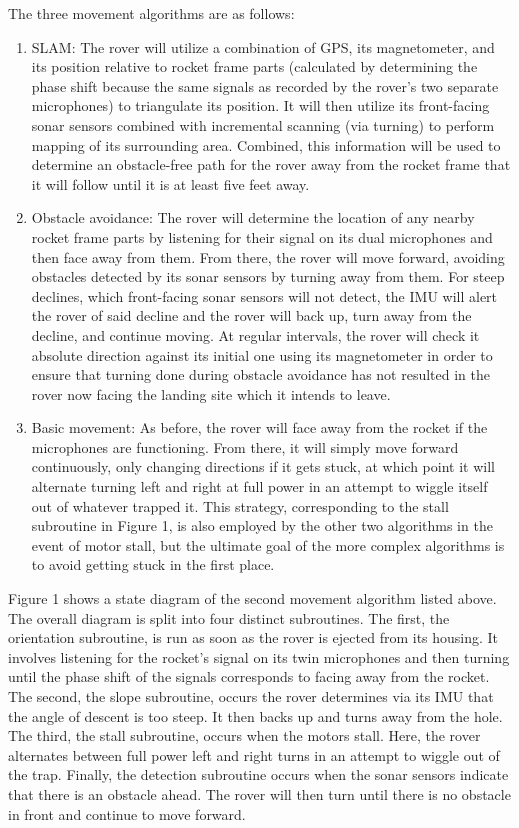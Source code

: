 \documentclass[onecolumn, draftclsnofoot,10pt, compsoc]{IEEEtran}
\begin{document}
The three movement algorithms are as follows:
\begin{enumerate}
\item SLAM: The rover will utilize a combination of GPS, its magnetometer, and its position relative to rocket frame parts (calculated by determining the phase shift because the same signals as recorded by the rover's two separate microphones) to triangulate its position. It will then utilize its front-facing sonar sensors combined with incremental scanning (via turning) to perform mapping of its surrounding area. Combined, this information will be used to determine an obstacle-free path for the rover away from the rocket frame that it will follow until it is at least five feet away. 
\item Obstacle avoidance: The rover will determine the location of any nearby rocket frame parts by listening for their signal on its dual microphones and then face away from them. From there, the rover will move forward, avoiding obstacles detected by its sonar sensors by turning away from them. For steep declines, which front-facing sonar sensors will not detect, the IMU will alert the rover of said decline and the rover will back up, turn away from the decline, and continue moving. At regular intervals, the rover will check it absolute direction against its initial one using its magnetometer in order to ensure that turning done during obstacle avoidance has not resulted in the rover now facing the landing site which it intends to leave.
\item Basic movement: As before, the rover will face away from the rocket if the microphones are functioning. From there, it will simply move forward continuously, only changing directions if it gets stuck, at which point it will alternate turning left and right at full power in an attempt to wiggle itself out of whatever trapped it. This strategy, corresponding to the stall subroutine in Figure 1, is also employed by the other two algorithms in the event of motor stall, but the ultimate goal of the more complex algorithms is to avoid getting stuck in the first place.
\end{enumerate}
Figure 1 shows a state diagram of the second movement algorithm listed above. The overall diagram is split into four distinct subroutines. The first, the orientation subroutine, is run as soon as the rover is ejected from its housing. It involves listening for the rocket's signal on its twin microphones and then turning until the phase shift of the signals corresponds to facing away from the rocket. The second, the slope subroutine, occurs the rover determines via its IMU that the angle of descent is too steep. It then backs up and turns away from the hole. The third, the stall subroutine, occurs when the motors stall. Here, the rover alternates between full power left and right turns in an attempt to wiggle out of the trap. Finally, the detection subroutine occurs when the sonar sensors indicate that there is an obstacle ahead. The rover will then turn until there is no obstacle in front and continue to move forward.
\end{document}
